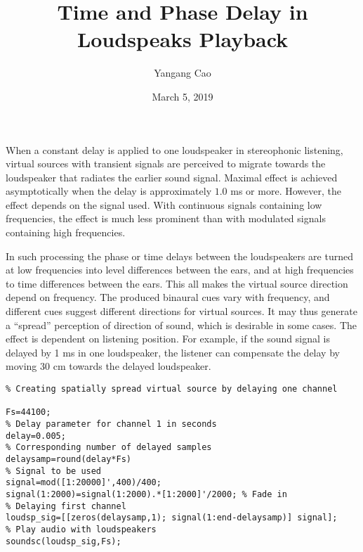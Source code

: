 \documentclass[10pt,a4paper,oneside]{article}
\author{Yangang Cao}
\date{March 5, 2019}
\begin{document}
\title{Time and Phase Delay in Loudspeaks Playback}
\maketitle 
When a constant delay is applied to one loudspeaker in stereophonic listening, virtual sources with transient signals are perceived to migrate towards the loudspeaker that radiates the earlier sound signal. Maximal effect is achieved asymptotically when the delay is approximately $1.0$ ms or more. However, the effect depends on the signal used. With continuous signals containing low frequencies, the effect is much less prominent than with modulated signals containing high frequencies.

In such processing the phase or time delays between the loudspeakers are turned at low frequencies into level differences between the ears, and at high frequencies to time differences between the ears. This all makes the virtual source direction depend on frequency. The produced binaural cues vary with frequency, and different cues suggest different directions for virtual sources. It may thus generate a “spread” perception of direction of sound, which is desirable in some cases. The effect is dependent on listening position. For example, if the sound signal is delayed by 1 ms in one loudspeaker, the listener can compensate the delay by moving 30 cm towards the delayed loudspeaker.
\begin{lstlisting}
% Creating spatially spread virtual source by delaying one channel

Fs=44100;
% Delay parameter for channel 1 in seconds
delay=0.005; 
% Corresponding number of delayed samples
delaysamp=round(delay*Fs)
% Signal to be used
signal=mod([1:20000]',400)/400; 
signal(1:2000)=signal(1:2000).*[1:2000]'/2000; % Fade in
% Delaying first channel
loudsp_sig=[[zeros(delaysamp,1); signal(1:end-delaysamp)] signal];
% Play audio with loudspeakers
soundsc(loudsp_sig,Fs);
\end{lstlisting}
\end{document}

